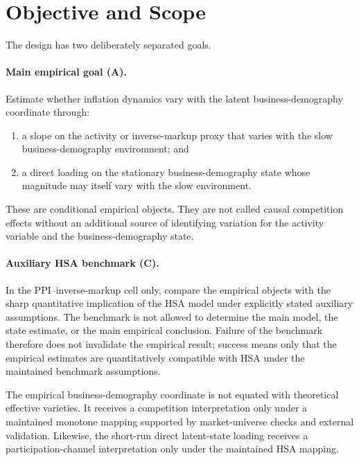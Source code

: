 \documentclass[11pt]{article}
\begin{document}
\tableofcontents
\newpage

\section{Objective and Scope}

The design has two deliberately separated goals.

\paragraph{Main empirical goal (A).}
Estimate whether inflation dynamics vary with the latent business-demography coordinate through:
\begin{enumerate}
\item a slope on the activity or inverse-markup proxy that varies with the slow business-demography environment; and
\item a direct loading on the stationary business-demography state whose magnitude may itself vary with the slow environment.
\end{enumerate}
These are conditional empirical objects. They are not called causal competition effects without an additional source of identifying variation for the activity variable and the business-demography state.

\paragraph{Auxiliary HSA benchmark (C).}
In the PPI--inverse-markup cell only, compare the empirical objects with the sharp quantitative implication of the HSA model under explicitly stated auxiliary assumptions. The benchmark is not allowed to determine the main model, the state estimate, or the main empirical conclusion. Failure of the benchmark therefore does not invalidate the empirical result; success means only that the empirical estimates are quantitatively compatible with HSA under the maintained benchmark assumptions.

The empirical business-demography coordinate is not equated with theoretical effective varieties. It receives a competition interpretation only under a maintained monotone mapping supported by market-universe checks and external validation. Likewise, the short-run direct latent-state loading receives a participation-channel interpretation only under the maintained HSA mapping.
\end{document}
